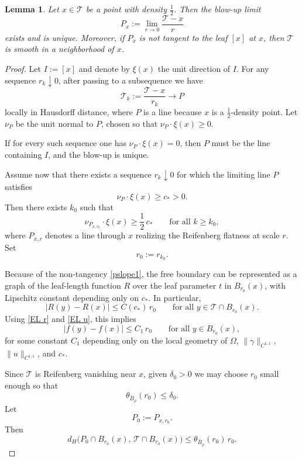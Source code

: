 \documentclass[reqno,11pt]{amsart}
\makeatletter
\newtheorem{lem}[thm]{Lemma}%
\numberwithin{equation}{section}
\theoremstyle{remark}
\makeatother
\begin{document}
\begin{lem}\label{goodpoint}
Let $x\in\mathcal T$ be a point with density $\frac12$. Then the blow-up limit
\[
P_x:=\lim_{r\to0}\frac{\mathcal T-x}{r}
\]
exists and is unique. Moreover, if $P_x$ is not tangent to the leaf $[x]$ at $x$,
then $\mathcal T$ is smooth in a neighborhood of $x$.
\end{lem}

\begin{proof}
Let $I:=[x]$ and denote by $\xi(x)$ the unit direction of $I$.
For any sequence $r_k\downarrow0$, after passing to a subsequence we have
\[
\mathcal T_k:=\frac{\mathcal T-x}{r_k}\to P
\]
locally in Hausdorff distance, where $P$ is a line because $x$ is a $\frac12$-density point.
Let $\nu_P$ be the unit normal to $P$, chosen so that $\nu_P\cdot\xi(x)\ge0$.

If for every such sequence one has $\nu_P\cdot\xi(x)=0$, then $P$ must be the line containing
$I$, and the blow-up is unique.

Assume now that there exists a sequence $r_k\downarrow0$ for which the limiting line $P$
satisfies
\begin{equation}\label{nontangent0}
\nu_P\cdot\xi(x)\ge c_\ast>0.
\end{equation}
Then there exists $k_0$ such that
\begin{equation}\label{pslope1}
\nu_{P_{x,r_k}}\cdot\xi(x)\ge \frac12\,c_\ast
\qquad\text{for all }k\ge k_0,
\end{equation}
where $P_{x,r}$ denotes a line through $x$ realizing the Reifenberg flatness at scale $r$.
Set
\[
r_0:=r_{k_0}.
\]

Because of the non-tangency \eqref{pslope1}, the free boundary can be represented as a graph
of the leaf-length function $R$ over the leaf parameter $t$ in $B_{r_0}(x)$, with Lipschitz
constant depending only on $c_\ast$.
In particular,
\[
|R(y)-R(x)|\le C(c_\ast)\,r_0
\qquad\text{for all }y\in \mathcal T\cap B_{r_0}(x).
\]
Using \eqref{EL r} and \eqref{EL u}, this implies
\begin{equation}\label{iteration0}
|f(y)-f(x)|\le C_1\,r_0
\qquad\text{for all }y\in B_{r_0}(x),
\end{equation}
for some constant $C_1$ depending only on the local geometry of $\Omega$,
$\|\gamma\|_{C^{1,1}}$, $\|u\|_{C^{1,1}}$, and $c_\ast$.

Since $\mathcal T$ is Reifenberg vanishing near $x$, given $\delta_0>0$ we may choose $r_0$
small enough so that
\begin{equation}\label{inismall}
\theta_{\overline B_\rho}(r_0)\le \delta_0.
\end{equation}
Let
\[
P_0:=P_{x,r_0}.
\]
Then
\begin{equation}\label{iteration1}
d_H\bigl(P_0\cap B_{r_0}(x),\,\mathcal T\cap B_{r_0}(x)\bigr)
\le \theta_{\overline B_\rho}(r_0)\,r_0.
\end{equation}


\end{proof}
\end{document}
